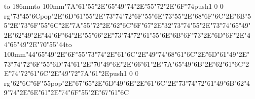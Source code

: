 \hbox to 186mm{\hsize=81mm\vbox to 100mm{\vfill\ipa\char"7A\ipa\char"61\ipa\char"55\ipa\char"2E\ipa\char"65\ipa\char"49\ipa\char"74\ipa\char"2E\ipa\char"55\ipa\char"72\ipa\char"2E\ipa\char"6F\ipa\char"74\medskip\pdfcolorstack\match push{1 0 0 rg}\ipa\char"73\ipa\char"45\ipa\char"6C\pdfcolorstack\match pop{}\ipa\char"2E\ipa\char"6D\ipa\char"61\ipa\char"55\ipa\char"2E\ipa\char"73\ipa\char"74\ipa\char"72\ipa\char"6F\ipa\char"55\ipa\char"6E\medskip\ipa\char"73\ipa\char"55\ipa\char"2E\ipa\char"68\ipa\char"6F\ipa\char"6C\ipa\char"2E\ipa\char"6B\ipa\char"55\ipa\char"2E\ipa\char"73\ipa\char"6F\ipa\char"55\ipa\char"6C\ipa\char"2E\ipa\char"7A\ipa\char"55\ipa\char"72\ipa\char"2E\ipa\char"62\ipa\char"6C\ipa\char"6F\ipa\char"67\ipa\char"2E\ipa\char"32\ipa\char"73\ipa\char"74\medskip\ipa\char"55\ipa\char"2E\ipa\char"73\ipa\char"74\ipa\char"65\ipa\char"49\ipa\char"2E\ipa\char"62\ipa\char"49\ipa\char"2E\ipa\char"44\ipa\char"6F\ipa\char"64\ipa\char"2E\ipa\char"55\ipa\char"66\ipa\char"2E\ipa\char"73\ipa\char"74\ipa\char"72\ipa\char"61\ipa\char"55\ipa\char"6E\medskip\ipa\char"6B\ipa\char"6F\ipa\char"73\ipa\char"2E\ipa\char"6D\ipa\char"6F\ipa\char"2E\ipa\char"44\ipa\char"65\ipa\char"49\ipa\char"2E\ipa\char"70\ipa\char"55\ipa\char"44\vfill}\hfill\vbox to 100mm{\vfill\ipa\char"44\ipa\char"65\ipa\char"49\ipa\char"2E\ipa\char"6F\ipa\char"55\ipa\char"73\ipa\char"74\ipa\char"2E\ipa\char"61\ipa\char"6C\ipa\char"2E\ipa\char"49\ipa\char"74\medskip\ipa\char"68\ipa\char"61\ipa\char"6C\ipa\char"2E\ipa\char"6D\ipa\char"61\ipa\char"49\ipa\char"2E\ipa\char"73\ipa\char"74\ipa\char"72\ipa\char"6F\ipa\char"55\ipa\char"6D\medskip\ipa\char"74\ipa\char"61\ipa\char"2E\ipa\char"70\ipa\char"49\ipa\char"6E\ipa\char"2E\ipa\char"66\ipa\char"61\ipa\char"2E\ipa\char"7A\ipa\char"65\ipa\char"49\ipa\char"6B\ipa\char"2E\ipa\char"62\ipa\char"61\ipa\char"6C\ipa\char"2E\ipa\char"74\ipa\char"72\ipa\char"61\ipa\char"6C\ipa\char"2E\ipa\char"49\ipa\char"72\ipa\char"7A\medskip\ipa\char"61\ipa\char"2E\pdfcolorstack\match push{1 0 0 rg}\ipa\char"62\ipa\char"6C\ipa\char"6F\ipa\char"55\pdfcolorstack\match pop{}\ipa\char"2E\ipa\char"67\ipa\char"65\ipa\char"2E\ipa\char"6D\ipa\char"49\ipa\char"6E\ipa\char"2E\ipa\char"61\ipa\char"6C\ipa\char"2E\ipa\char"73\ipa\char"74\ipa\char"72\ipa\char"61\ipa\char"49\ipa\char"6B\medskip\ipa\char"62\ipa\char"49\ipa\char"74\ipa\char"2E\ipa\char"6E\ipa\char"61\ipa\char"2E\ipa\char"74\ipa\char"6F\ipa\char"55\ipa\char"2E\ipa\char"67\ipa\char"61\ipa\char"6C\vfill}}\eject
